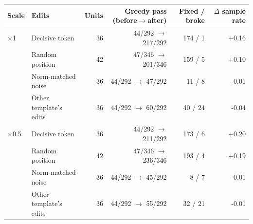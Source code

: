 \begin{tabular}{llrrrr}
\toprule
Scale & Edits & Units & Greedy pass (before$\to$after) & Fixed / broke & $\Delta$ sample rate \\
\midrule
$\times$1 & Decisive token & 36 & 44/292 $\to$ 217/292 & 174 / 1 & +0.16 \\
 & Random position & 42 & 47/346 $\to$ 201/346 & 159 / 5 & +0.10 \\
 & Norm-matched noise & 36 & 44/292 $\to$ 47/292 & 11 / 8 & -0.01 \\
 & Other template's edits & 36 & 44/292 $\to$ 60/292 & 40 / 24 & -0.04 \\
\midrule
$\times$0.5 & Decisive token & 36 & 44/292 $\to$ 211/292 & 173 / 6 & +0.20 \\
 & Random position & 42 & 47/346 $\to$ 236/346 & 193 / 4 & +0.19 \\
 & Norm-matched noise & 36 & 44/292 $\to$ 45/292 & 8 / 7 & -0.01 \\
 & Other template's edits & 36 & 44/292 $\to$ 55/292 & 32 / 21 & -0.01 \\
\bottomrule
\end{tabular}
